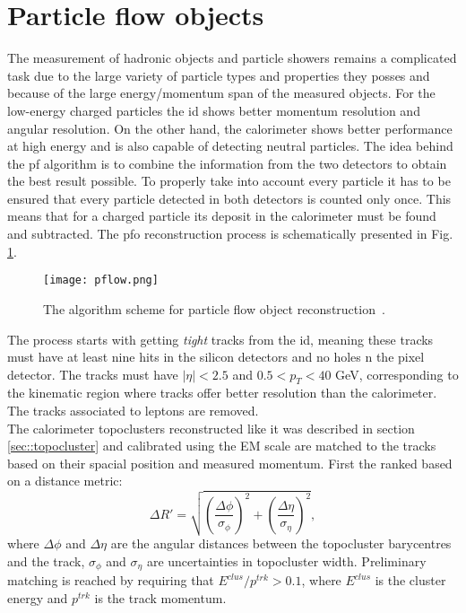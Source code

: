       \section{Particle flow objects}
      \label{sec:pfo}
      The measurement of hadronic objects and particle showers remains a complicated task due to the large variety of particle types and properties they posses and because of the large energy/momentum span of the measured objects. For the low-energy charged particles the \gls{id} shows better momentum resolution and angular resolution. On the other hand, the calorimeter shows better performance at high energy and is also capable of detecting neutral particles. The idea behind the \gls{pf} algorithm \cite{pflow} is to combine the information from the two detectors to obtain the best result possible. To properly take into account every particle it has to be ensured that every particle detected in both detectors is counted only once. This means that for a charged particle its deposit in the calorimeter must be found and subtracted. The \gls{pfo} reconstruction process is schematically presented in Fig. \ref{fig::pflow}.
      	\begin{figure}[htbp]
      	\centering
      	\texttt{[image: pflow.png]}
      	\caption[pflow]{The algorithm scheme for particle flow object reconstruction~\cite{pflow}.}
      	\label{fig::pflow}
      \end{figure}
  	  The process starts with getting \textit{tight} tracks from the \gls{id}, meaning these tracks must have at least nine hits in the silicon detectors and no holes n the pixel detector. The tracks must have $|\eta| < 2.5$ and $0.5 < p_T < 40$ GeV, corresponding to the kinematic region where tracks offer better resolution than the calorimeter. The tracks associated to leptons are removed. \\
  	  The calorimeter topoclusters reconstructed like it was described in section \ref{sec::topocluster} and calibrated using the EM scale are matched to the tracks based on their spacial position and measured momentum. First the ranked based on a distance metric:
  	  	\begin{equation}
  	  \Delta R'=\sqrt{\left(\frac{\Delta \phi}{\sigma_{\phi}}\right)^2+\left(\frac{\Delta \eta}{\sigma_{\eta}}\right)^2},
  	  \end{equation}
  	  where $\Delta \phi$ and $\Delta \eta$ are the angular distances between the topocluster barycentres and the track, $\sigma_{\phi}$ and $\sigma_{\eta}$ are uncertainties in topocluster width. Preliminary matching is reached by requiring that $E^{clus}/p^{trk}>0.1$, where $E^{clus}$ is the cluster energy and $p^{trk}$ is the track momentum.\\
